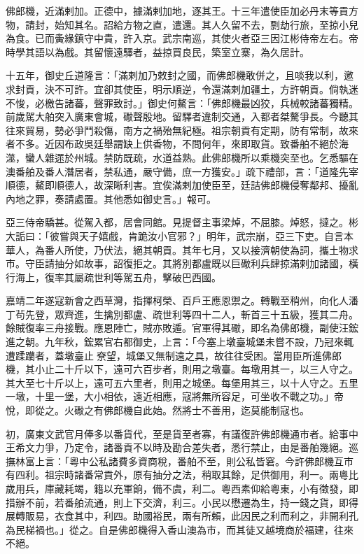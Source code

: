 \begin{pinyinscope}
佛郎機，近滿剌加。正德中，據滿剌加地，逐其王。十三年遣使臣加必丹末等貢方物，請封，始知其名。詔給方物之直，遣還。其人久留不去，剽劫行旅，至掠小兒為食。已而夤緣鎮守中貴，許入京。武宗南巡，其使火者亞三因江彬侍帝左右。帝時學其語以為戲。其留懷遠驛者，益掠買良民，築室立寨，為久居計。

十五年，御史丘道隆言：「滿剌加乃敕封之國，而佛郎機敢併之，且啖我以利，邀求封貢，決不可許。宜卻其使臣，明示順逆，令還滿剌加疆土，方許朝貢。倘執迷不悛，必檄告諸蕃，聲罪致討。」御史何鰲言：「佛郎機最凶狡，兵械較諸蕃獨精。前歲駕大舶突入廣東會城，礮聲殷地。留驛者違制交通，入都者桀驁爭長。今聽其往來貿易，勢必爭鬥殺傷，南方之禍殆無紀極。祖宗朝貢有定期，防有常制，故來者不多。近因布政吳廷舉謂缺上供香物，不問何年，來即取貨。致番舶不絕於海澨，蠻人雜遝於州城。禁防既疏，水道益熟。此佛郎機所以乘機突至也。乞悉驅在澳番舶及番人潛居者，禁私通，嚴守備，庶一方獲安。」疏下禮部，言：「道隆先宰順德，鰲即順德人，故深晰利害。宜俟滿剌加使臣至，廷詰佛郎機侵奪鄰邦、擾亂內地之罪，奏請處置。其他悉如御史言。」報可。

亞三侍帝驕甚。從駕入都，居會同館。見提督主事梁焯，不屈膝。焯怒，撻之。彬大詬曰：「彼嘗與天子嬉戲，肯跪汝小官邪？」明年，武宗崩，亞三下吏。自言本華人，為番人所使，乃伏法，絕其朝貢。其年七月，又以接濟朝使為詞，攜土物求市。守臣請抽分如故事，詔復拒之。其將別都盧既以巨礮利兵肆掠滿剌加諸國，橫行海上，復率其屬疏世利等駕五舟，擊破巴西國。

嘉靖二年遂寇新會之西草灣，指揮柯榮、百戶王應恩禦之。轉戰至稍州，向化人潘丁茍先登，眾齊進，生擒別都盧、疏世利等四十二人，斬首三十五級，獲其二舟。餘賊復率三舟接戰。應恩陣亡，賊亦敗遁。官軍得其礮，即名為佛郎機，副使汪鋐進之朝。九年秋，鋐累官右都御史，上言：「今塞上墩臺城堡未嘗不設，乃冠來輒遭蹂躪者，蓋墩臺止尞望，城堡又無制遠之具，故往往受困。當用臣所進佛郎機，其小止二十斤以下，遠可六百步者，則用之墩臺。每墩用其一，以三人守之。其大至七十斤以上，遠可五六里者，則用之城堡。每堡用其三，以十人守之。五里一墩，十里一堡，大小相依，遠近相應，寇將無所容足，可坐收不戰之功。」帝悅，即從之。火礮之有佛郎機自此始。然將士不善用，迄莫能制寇也。

初，廣東文武官月俸多以番貨代，至是貨至者寡，有議復許佛郎機通市者。給事中王希文力爭，乃定令，諸番貢不以時及勘合差失者，悉行禁止，由是番舶幾絕。巡撫林富上言：「粵中公私諸費多資商稅，番舶不至，則公私皆窘。今許佛郎機互市有四利。祖宗時諸番常貢外，原有抽分之法，稍取其餘，足供御用，利一。兩粵比歲用兵，庫藏耗竭，籍以充軍餉，備不虞，利二。粵西素仰給粵東，小有徵發，即措辦不前，若番舶流通，則上下交濟，利三。小民以懋遷為生，持一錢之貨，即得展轉販易，衣食其中，利四。助國裕民，兩有所賴，此因民之利而利之，非開利孔為民梯禍也。」從之。自是佛郎機得入香山澳為市，而其徒又越境商於福建，往來不絕。


\end{pinyinscope}
